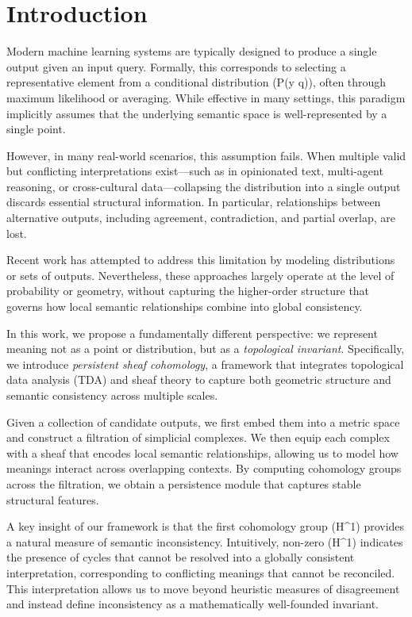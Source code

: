\section{Introduction}

Modern machine learning systems are typically designed to produce a single output given an input query. Formally, this corresponds to selecting a representative element from a conditional distribution (P(y \mid q)), often through maximum likelihood or averaging. While effective in many settings, this paradigm implicitly assumes that the underlying semantic space is well-represented by a single point.

However, in many real-world scenarios, this assumption fails. When multiple valid but conflicting interpretations exist—such as in opinionated text, multi-agent reasoning, or cross-cultural data—collapsing the distribution into a single output discards essential structural information. In particular, relationships between alternative outputs, including agreement, contradiction, and partial overlap, are lost.

Recent work has attempted to address this limitation by modeling distributions or sets of outputs. Nevertheless, these approaches largely operate at the level of probability or geometry, without capturing the higher-order structure that governs how local semantic relationships combine into global consistency.

In this work, we propose a fundamentally different perspective: we represent meaning not as a point or distribution, but as a \emph{topological invariant}. Specifically, we introduce \emph{persistent sheaf cohomology}, a framework that integrates topological data analysis (TDA) and sheaf theory to capture both geometric structure and semantic consistency across multiple scales.

Given a collection of candidate outputs, we first embed them into a metric space and construct a filtration of simplicial complexes. We then equip each complex with a sheaf that encodes local semantic relationships, allowing us to model how meanings interact across overlapping contexts. By computing cohomology groups across the filtration, we obtain a persistence module that captures stable structural features.

A key insight of our framework is that the first cohomology group (H^1) provides a natural measure of semantic inconsistency. Intuitively, non-zero (H^1) indicates the presence of cycles that cannot be resolved into a globally consistent interpretation, corresponding to conflicting meanings that cannot be reconciled. This interpretation allows us to move beyond heuristic measures of disagreement and instead define inconsistency as a mathematically well-founded invariant.

